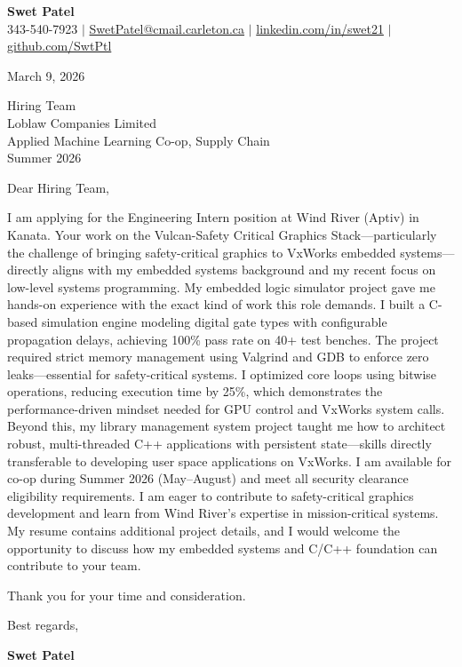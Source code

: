 \documentclass[letterpaper,11pt]{article}
\begin{document}
\begin{center}
    \textbf{\Large Swet Patel} \\[4pt]
    \small 343-540-7923 $|$
    \href{mailto:SwetPatel@cmail.carleton.ca}{SwetPatel@cmail.carleton.ca} $|$
    \href{https://linkedin.com/in/swet21}{linkedin.com/in/swet21} $|$
    \href{https://github.com/SwtPtl}{github.com/SwtPtl}
\end{center}

\vspace{8pt}
March 9, 2026

\vspace{8pt}
Hiring Team \\
Loblaw Companies Limited \\
Applied Machine Learning Co-op, Supply Chain \\
Summer 2026

\vspace{12pt}
Dear Hiring Team,


I am applying for the Engineering Intern position at Wind River (Aptiv) in Kanata. Your work on the Vulcan-Safety Critical Graphics Stack—particularly the challenge of bringing safety-critical graphics to VxWorks embedded systems—directly aligns with my embedded systems background and my recent focus on low-level systems programming. \vspace{12pt} My embedded logic simulator project gave me hands-on experience with the exact kind of work this role demands. I built a C-based simulation engine modeling digital gate types with configurable propagation delays, achieving 100\% pass rate on 40+ test benches. The project required strict memory management using Valgrind and GDB to enforce zero leaks—essential for safety-critical systems. I optimized core loops using bitwise operations, reducing execution time by 25\%, which demonstrates the performance-driven mindset needed for GPU control and VxWorks system calls. Beyond this, my library management system project taught me how to architect robust, multi-threaded C++ applications with persistent state—skills directly transferable to developing user space applications on VxWorks. \vspace{12pt} I am available for co-op during Summer 2026 (May–August) and meet all security clearance eligibility requirements. I am eager to contribute to safety-critical graphics development and learn from Wind River's expertise in mission-critical systems. My resume contains additional project details, and I would welcome the opportunity to discuss how my embedded systems and C/C++ foundation can contribute to your team.

\vspace{12pt}
Thank you for your time and consideration.

\vspace{16pt}
Best regards,

\vspace{4pt}
\textbf{Swet Patel}
\end{document}
